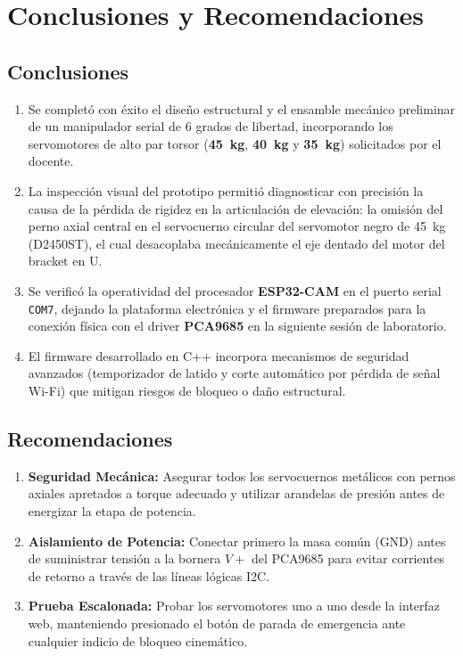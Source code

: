 \documentclass[11pt,a4paper]{article}
\begin{document}
\section{Conclusiones y Recomendaciones}

\subsection{Conclusiones}
\begin{enumerate}
    \item Se completó con éxito el diseño estructural y el ensamble mecánico preliminar de un manipulador serial de 6 grados de libertad, incorporando los servomotores de alto par torsor (\textbf{45~kg}, \textbf{40~kg} y \textbf{35~kg}) solicitados por el docente.
    \item La inspección visual del prototipo permitió diagnosticar con precisión la causa de la pérdida de rigidez en la articulación de elevación: la omisión del perno axial central en el servocuerno circular del servomotor negro de 45~kg (D2450ST), el cual desacoplaba mecánicamente el eje dentado del motor del bracket en U.
    \item Se verificó la operatividad del procesador \textbf{ESP32-CAM} en el puerto serial \texttt{COM7}, dejando la plataforma electrónica y el firmware preparados para la conexión física con el driver \textbf{PCA9685} en la siguiente sesión de laboratorio.
    \item El firmware desarrollado en C++ incorpora mecanismos de seguridad avanzados (temporizador de latido y corte automático por pérdida de señal Wi-Fi) que mitigan riesgos de bloqueo o daño estructural.
\end{enumerate}

\subsection{Recomendaciones}
\begin{enumerate}
    \item \textbf{Seguridad Mecánica:} Asegurar todos los servocuernos metálicos con pernos axiales apretados a torque adecuado y utilizar arandelas de presión antes de energizar la etapa de potencia.
    \item \textbf{Aislamiento de Potencia:} Conectar primero la masa común (GND) antes de suministrar tensión a la bornera $V+$ del PCA9685 para evitar corrientes de retorno a través de las líneas lógicas I2C.
    \item \textbf{Prueba Escalonada:} Probar los servomotores uno a uno desde la interfaz web, manteniendo presionado el botón de parada de emergencia ante cualquier indicio de bloqueo cinemático.
\end{enumerate}
\end{document}
